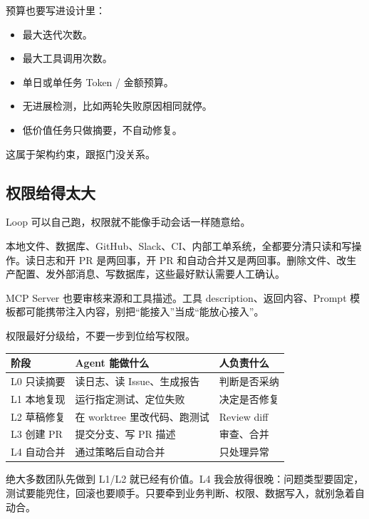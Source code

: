\documentclass[10pt,a4paper]{ctexart}
\begin{document}
预算也要写进设计里：


\begin{itemize}[itemsep=2pt, topsep=4pt]
  \item 最大迭代次数。
  \item 最大工具调用次数。
  \item 单日或单任务 Token / 金额预算。
  \item 无进展检测，比如两轮失败原因相同就停。
  \item 低价值任务只做摘要，不自动修复。
\end{itemize}


这属于架构约束，跟抠门没关系。



\subsection{权限给得太大}


Loop 可以自己跑，权限就不能像手动会话一样随意给。



本地文件、数据库、GitHub、Slack、CI、内部工单系统，全都要分清只读和写操作。读日志和开 PR 是两回事，开 PR 和自动合并又是两回事。删除文件、改生产配置、发外部消息、写数据库，这些最好默认需要人工确认。



MCP Server 也要审核来源和工具描述。工具 description、返回内容、Prompt 模板都可能携带注入内容，别把“能接入”当成“能放心接入”。



权限最好分级给，不要一步到位给写权限。


{\footnotesize
\begin{tabularx}{\textwidth}{|X|X|X|}
\hline
\textbf{阶段} & \textbf{Agent 能做什么} & \textbf{人负责什么} \\
\hline
L0 只读摘要 & 读日志、读 Issue、生成报告 & 判断是否采纳 \\
\hline
L1 本地复现 & 运行指定测试、定位失败 & 决定是否修复 \\
\hline
L2 草稿修复 & 在 worktree 里改代码、跑测试 & Review diff \\
\hline
L3 创建 PR & 提交分支、写 PR 描述 & 审查、合并 \\
\hline
L4 自动合并 & 通过策略后自动合并 & 只处理异常 \\
\hline
\end{tabularx}
}



绝大多数团队先做到 L1/L2 就已经有价值。L4 我会放得很晚：问题类型要固定，测试要能兜住，回滚也要顺手。只要牵到业务判断、权限、数据写入，就别急着自动合。
\end{document}
